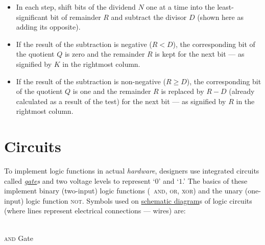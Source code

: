 \documentclass[11pt]{article}%
\begin{document}
\begin{multicols}{2}
\begin{itemize}
\item In each step, shift bits of the dividend $N$ one at a time into the least-significant bit of remainder $R$ and subtract the divisor $D$ (shown here as adding its opposite).
\item If the result of the subtraction is negative ($R < D$), the corresponding bit of the quotient $Q$ is zero and the remainder $R$ is kept for the next bit --- as signified by $K$ in the rightmost column.
\item If the result of the subtraction is non-negative ($R \ge D$), the corresponding bit of the quotient $Q$ is one and the remainder $R$ is replaced by $R - D$ (already calculated as a result of the test) for the next bit --- as signified by $R$ in the rightmost column.
\end{itemize}

\section{Circuits}
\label{Circuits}

To implement logic functions in actual \textit{hardware}, designers use integrated circuits called \textit{\href{https://en.wikipedia.org/wiki/Logic_gate}{gate}s} \citep{wiki:logic-gate} and two voltage levels to represent `$0$' and `$1$.' The basics of these implement binary (two-input) logic functions (\eg\ \textsc{and}, \textsc{or}, \textsc{xor}) and the unary (one-input) logic function \textsc{not}. Symbols used on \href{https://en.wikipedia.org/wiki/Schematic#Electrical_and_electronic_industry}{schematic diagram}s of logic circuits (where lines represent electrical connections --- wires) are:


\begin{center}
 \\\textsc{and} Gate
\end{center}


\end{multicols}
\end{document}
